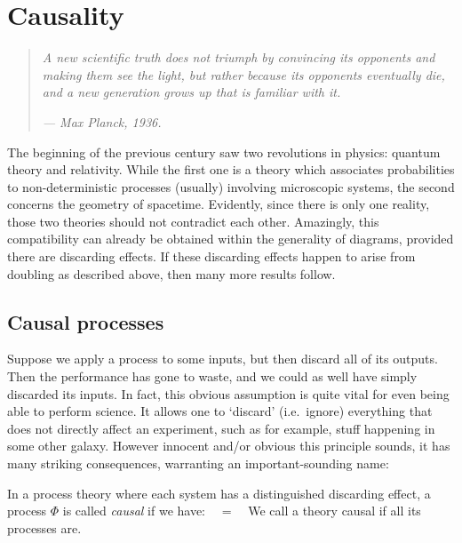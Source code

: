 \documentclass[10pt]{article}
\begin{document}

\section{Causality}\label{sec:causality}
  
\begin{quote}
\em A new scientific truth does not triumph by convincing its opponents and making them see the light, but rather because its opponents eventually die, and a new generation grows up that is familiar with it.  
\par \em \hfill    --- Max Planck, 1936.      
\end{quote}

\noindent
The beginning of the previous century saw two revolutions in physics: quantum theory and relativity. While the first one is a  theory which associates probabilities to non-deterministic processes (usually) involving microscopic systems, the second concerns the geometry of spacetime. Evidently, since there is only one reality, those two theories should not contradict each other. Amazingly, this compatibility can already be obtained within the generality of diagrams, provided there are discarding effects. If  these discarding  effects happen to arise from doubling as described above, then many more results follow.

\subsection{Causal processes}

Suppose we apply  a process to some inputs, but then discard all of its outputs.  Then the performance has gone to waste, and we could as well  have simply discarded its inputs.  In fact, this obvious assumption is quite vital for even being able to perform science.  It allows one to `discard'  (i.e.~ignore) everything that does not directly affect an experiment,  such as for example,  stuff happening in  some other galaxy. However innocent and/or obvious this principle sounds, it has many striking consequences,  warranting an important-sounding name:

\begin{definition}\label{def:eq:causqmaps}
In a process theory where each system  has a  distinguished discarding effect, a process ${\Phi}$ is called \textit{causal} if we have: 
\beq\label{eq:causqmaps}
\ \ = \ \, \discard
\eeq
We call a theory causal if all its processes are.
\end{definition}
\end{document}
